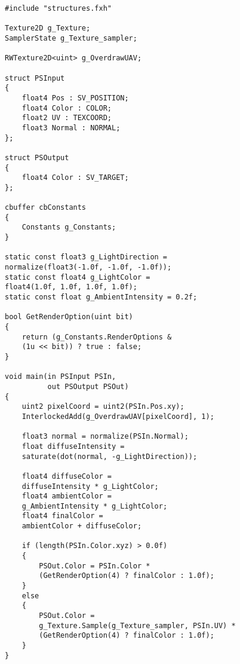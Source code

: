 \begin{lstlisting}
#include "structures.fxh"

Texture2D g_Texture;
SamplerState g_Texture_sampler;

RWTexture2D<uint> g_OverdrawUAV;

struct PSInput
{
    float4 Pos : SV_POSITION;
    float4 Color : COLOR;
    float2 UV : TEXCOORD;
    float3 Normal : NORMAL;
};

struct PSOutput
{
    float4 Color : SV_TARGET;
};

cbuffer cbConstants
{
    Constants g_Constants;
}

static const float3 g_LightDirection = 
normalize(float3(-1.0f, -1.0f, -1.0f));
static const float4 g_LightColor = 
float4(1.0f, 1.0f, 1.0f, 1.0f);
static const float g_AmbientIntensity = 0.2f;

bool GetRenderOption(uint bit)
{
    return (g_Constants.RenderOptions & 
    (1u << bit)) ? true : false;
}

void main(in PSInput PSIn,
          out PSOutput PSOut)
{    
    uint2 pixelCoord = uint2(PSIn.Pos.xy);
    InterlockedAdd(g_OverdrawUAV[pixelCoord], 1);
    
    float3 normal = normalize(PSIn.Normal);
    float diffuseIntensity = 
    saturate(dot(normal, -g_LightDirection));

    float4 diffuseColor = 
    diffuseIntensity * g_LightColor;
    float4 ambientColor = 
    g_AmbientIntensity * g_LightColor;
    float4 finalColor = 
    ambientColor + diffuseColor;

    if (length(PSIn.Color.xyz) > 0.0f)
    {
        PSOut.Color = PSIn.Color * 
        (GetRenderOption(4) ? finalColor : 1.0f);
    }
    else
    {
        PSOut.Color = 
        g_Texture.Sample(g_Texture_sampler, PSIn.UV) * 
        (GetRenderOption(4) ? finalColor : 1.0f);
    }
}

\end{lstlisting}

